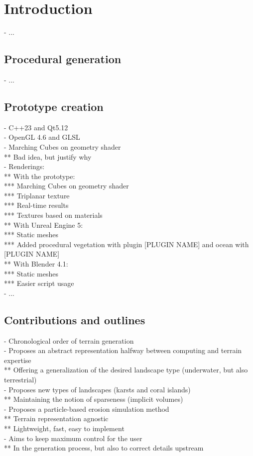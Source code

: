 \chapter{Introduction}
\label{chap:introduction}

- ...

\section{Procedural generation}
\label{sec:introduction_procedural-generation}
- ...

\section{Prototype creation}
\label{sec:introduction_prototype}
- C++23 and Qt5.12 \\
- OpenGL 4.6 and GLSL \\
- Marching Cubes on geometry shader \\
** Bad idea, but justify why \\
- Renderings: \\
** With the prototype: \\
*** Marching Cubes on geometry shader \\
*** Triplanar texture \\
*** Real-time results \\
*** Textures based on materials \\
** With Unreal Engine 5: \\
*** Static meshes \\
*** Added procedural vegetation with plugin [PLUGIN NAME] and ocean with [PLUGIN NAME] \\
** With Blender 4.1: \\
*** Static meshes \\
*** Easier script usage \\
- ...

\section{Contributions and outlines}
\label{sec:introduction_contribution-plan}
- Chronological order of terrain generation \\
- Proposes an abstract representation halfway between computing and terrain expertise \\
** Offering a generalization of the desired landscape type (underwater, but also terrestrial) \\
- Proposes new types of landscapes (karsts and coral islands) \\
** Maintaining the notion of sparseness (implicit volumes) \\
- Proposes a particle-based erosion simulation method \\
** Terrain representation agnostic \\
** Lightweight, fast, easy to implement \\
- Aims to keep maximum control for the user \\ 
** In the generation process, but also to correct details upstream

